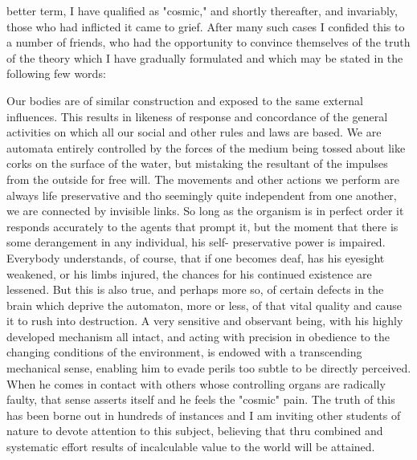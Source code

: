 \documentclass[a4paper,12pt,english,twoside,openright]{memoir}
\begin{document}
better term, I have qualified as "cosmic," and shortly thereafter, and invariably, those who had 
inflicted it came to grief.  After many such cases I confided this to a number of friends, who had 
the opportunity to convince themselves of the truth of the theory which I have gradually 
formulated and which may be stated in the following few words: 

Our bodies are of similar construction and exposed to the same external influences.  This results 
in likeness of response and concordance of the general activities on which all our social and other 
rules and laws are based.  We are automata entirely controlled by the forces of the medium being 
tossed about like corks on the surface of the water, but mistaking the resultant of the impulses 
from the outside for free will.  The movements and other actions we perform are always life 
preservative and tho seemingly quite independent from one another, we are connected by 
invisible links.  So long as the organism is in perfect order it responds accurately to the agents 
that prompt it, but the moment that there is some derangement in any individual, his self-
preservative power is impaired.  Everybody understands, of course, that if one becomes deaf, 
has his eyesight weakened, or his limbs injured, the chances for his continued existence are 
lessened.  But this is also true, and perhaps more so, of certain defects in the brain which deprive 
the automaton, more or less, of that vital quality and cause it to rush into destruction.  A very 
sensitive and observant being, with his highly developed mechanism all intact, and acting with 
precision in obedience to the changing conditions of the environment, is endowed with a 
transcending mechanical sense, enabling him to evade perils too subtle to be directly perceived.  
When he comes in contact with others whose controlling organs are radically faulty, that sense 
asserts itself and he feels the "cosmic" pain.  The truth of this has been borne out in hundreds of 
instances and I am inviting other students of nature to devote attention to this subject, believing 
that thru combined and systematic effort results of incalculable value to the world will be attained.  
\end{document}
